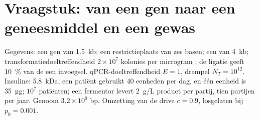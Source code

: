 \section{Vraagstuk: van een gen naar een geneesmiddel en een gewas}

\begin{problem}
\label{pb:b3:genetic-engineering:1}
Gegevens: een gen van \qty{1.5}{kb}; een restrictieplaats van zes
basen; een  van \qty{4}{kb}; transformatiedoeltreffendheid
$2\times 10^{7}$ kolonies per microgram ; de ligatie geeft
\qty{10}{\%} van de  een invoegsel.
qPCR-doeltreffendheid $E = 1$, drempel $N_{T} = 10^{12}$. Insuline:
\qty{5.8}{kDa}, een patiënt gebruikt $40$ eenheden per dag, en één
eenheid is \qty{35}{\micro g}; $10^{7}$ patiënten; een fermentor levert
\qty{2}{g/L} product per partij, tien partijen per jaar. Genoom
$3.2\times
10^{9}$ bp. Omzetting van de drive $c = 0.9$, losgelaten bij
$p_{0} = 0.001$.


\end{problem}
